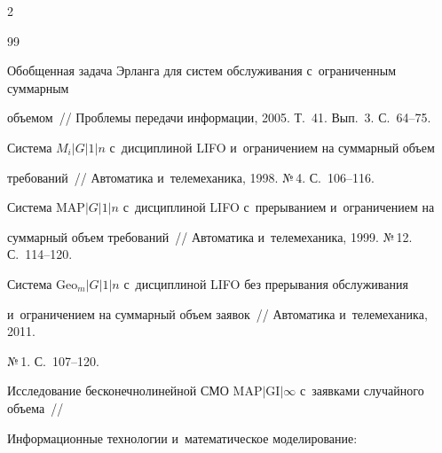 \begin{multicols}{2}
{{\begin{thebibliography}{99}






Обобщенная задача Эрланга для сис\-тем обслуживания с~ограниченным суммарным 


объемом~// {Проб\-ле\-мы передачи информации}, 2005. Т.~41. Вып.~3. С.~64--75.

















Система $M_i|G|1|n$ с~дисциплиной \mbox{LIFO} и~ограничением на суммарный объем 


требований~// {Автоматика и~телемеханика}, 1998. №\,4. С.~106--116.











Система $\mathrm{MAP}|G|1|n$ с~дисциплиной LIFO с~прерыванием и~ограничением на 


суммарный объем требований~// {Автоматика и~телемеханика}, 1999. №\,12. С.~114--120.











Сис\-те\-ма $\mathrm{Geo}_m|G|1|n$ с~дисциплиной LIFO без прерывания обслуживания 


и~ограничением на суммарный объем заявок~// {Автоматика и~телемеханика}, 2011. 


№\,1. С.~107--120.











Исследование бесконечнолинейной СМО $\mathrm{MAP}|\mathrm{GI}|\infty$ с~заявками случайного объема~// 


{Информационные технологии и~математическое моделирование: 


}
\end{thebibliography}}}
\end{multicols}
